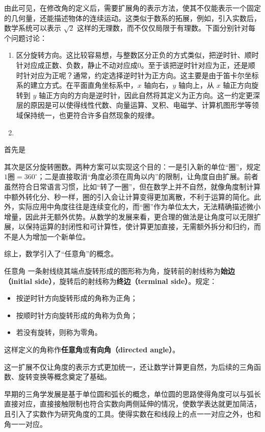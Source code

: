 由此可见，在修改角的定义后，需要扩展角的表示方法，使其不仅能表示一个固定的几何量，还能描述物体的连续运动。这类似于数系的拓展，例如，引入实数后，数学系统可以表示 $\sqrt{2}$ 这样的无理数，而不仅仅局限于有理数。下面分别针对每个问题讨论：
\begin{enumerate}
\item 区分旋转方向。这比较容易想，与整数区分正负的方式类似，把逆时针、顺时针对应成正数、负数，静止不动对应成$0$。至于该把逆时针对应为正，还是顺时针对应为正呢？通常，约定选择逆时针为正方向。这主要是由于笛卡尔坐标系的建立方式。在平面直角坐标系中，$x$ 轴向右，$y$ 轴向上，从 $x$ 轴正方向旋转到 $y$ 轴正方向的方向是逆时针，因此自然将其定义为正方向。这一约定更深层的原因是可以使得线性代数、向量运算、叉积、电磁学、计算机图形学等领域保持统一，也更符合许多自然现象的规律。
\item 
\end{enumerate}
首先是

其次是区分旋转圈数。两种方案可以实现这个目的：一是引入新的单位“圈”，规定$1\text{圈}=360^\circ$；二是直接取消“角度必须在周角以内”的限制，让角度自由扩展。前者虽然符合日常语言习惯，比如“转了一圈”，但在数学上并不自然，就像角度制计算中额外转化分、秒一样，圈的引入会让计算变得更加离散，不利于运算的简化。此外，实际应用中角度往往是连续变化的，而“圈”作为单位太大，无法精确描述微小增量，因此并无额外优势。从数学的发展来看，更合理的做法是让角度可以无限扩展，以保持运算的封闭性和可计算性，使计算更加直接，无需额外拆分和归约，而不是人为增加一个新单位。

综上，数学引入了“任意角”的概念。

\begin{definition}{任意角}
一条射线绕其端点旋转形成的图形称为角，旋转前的射线称为\textbf{始边（initial side）}，旋转后的射线称为\textbf{终边（terminal side）}。规定：
\begin{itemize}
\item 按逆时针方向旋转形成的角称为正角；
\item 按顺时针方向旋转形成的角称为负角；
\item 若没有旋转，则称为零角。
\end{itemize}
这样定义的角称作\textbf{任意角}或\textbf{有向角（directed angle）}。
\end{definition}

这一扩展不仅让角度的表示方式更加统一，还让数学计算更自然，为后续的三角函数、旋转变换等概念奠定了基础。



早期的三角学发展是基于单位圆和弧长的概念，单位圆的思路使得角度可以与弧长直接对应，直接接触限制也符合实数向两侧延伸的情况，使数学表达就更加简洁，且引入了实数作为研究角度的工具。使得实数在和线段上的点一一对应之外，也和角一一对应。

